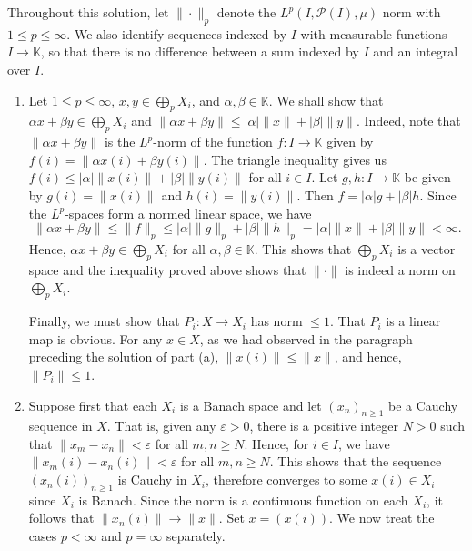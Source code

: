 \documentclass[10pt]{amsart}
\theoremstyle{thmstyle}
\theoremstyle{defstyle}
\newcommand{\K}{\mathbb{K}}
\newcommand{\scrP}{\mathscr P}
\renewcommand{\le}{\leqslant}
\renewcommand{\ge}{\geqslant}
\begin{document}
Throughout this solution, let $\|\cdot\|_p$ denote the $L^p\left(I,\scrP(I),\mu\right)$ norm with $1\le p\le\infty$. We also identify sequences indexed by $I$ with measurable functions $I\to\K$, so that there is no difference between a sum indexed by $I$ and an integral over $I$.

\begin{enumerate}[label=(\alph*)]
	\item Let $1\le p\le\infty$, $x, y\in\bigoplus_p X_i$, and $\alpha,\beta\in\K$. We shall show that $\alpha x + \beta y\in\bigoplus_p X_i$ and $\|\alpha x + \beta y\|\le |\alpha|\|x\| + |\beta|\|y\|$. Indeed, note that $\|\alpha x + \beta y\|$ is the $L^p$-norm of the function $f: I\to\K$ given by $f(i) = \left\|\alpha x(i) + \beta y(i)\right\|$. The triangle inequality gives us $f(i)\le |\alpha|\|x(i)\| + |\beta|\|y(i)\|$ for all $i\in I$. Let $g, h: I\to\K$ be given by $g(i) = \|x(i)\|$ and $h(i) = \|y(i)\|$. Then $f = |\alpha|g + |\beta|h$. Since the $L^p$-spaces form a normed linear space, we have 
	\begin{equation*}
		\|\alpha x + \beta y\|\le\|f\|_p\le |\alpha|\|g\|_p + |\beta|\|h\|_p = |\alpha|\|x\| + |\beta|\|y\| < \infty.
	\end{equation*}
	Hence, $\alpha x + \beta y\in\bigoplus_p X_i$ for all $\alpha,\beta\in\K$. This shows that $\bigoplus_p X_i$ is a vector space and the inequality proved above shows that $\|\cdot\|$ is indeed a norm on $\bigoplus_p X_i$.
	
	Finally, we must show that $P_i : X\to X_i$ has norm $\le 1$. That $P_i$ is a linear map is obvious. For any $x\in X$, as we had observed in the paragraph preceding the solution of part (a), $\|x(i)\|\le \|x\|$, and hence, $\|P_i\|\le 1$.


	\item Suppose first that each $X_i$ is a Banach space and let $(x_n)_{n\ge 1}$ be a Cauchy sequence in $X$. That is, given any $\varepsilon > 0$, there is a positive integer $N > 0$ such that $\|x_m - x_n\| < \varepsilon$ for all $m,n\ge N$. Hence, for $i\in I$, we have $\|x_m(i) - x_n(i)\| < \varepsilon$ for all $m,n\ge N$. This shows that the sequence $(x_n(i))_{n\ge 1}$ is Cauchy in $X_i$, therefore converges to some $x(i)\in X_i$ since $X_i$ is Banach. Since the norm is a continuous function on each $X_i$, it follows that $\|x_n(i)\|\to \|x\|$. Set $x = (x(i))$. We now treat the cases $p < \infty$ and $p = \infty$ separately. 
	

\end{enumerate}
\end{document}
